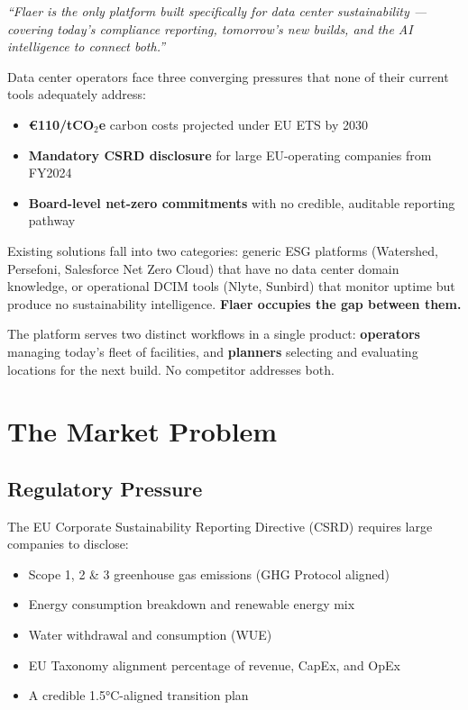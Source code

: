 \documentclass[11pt, a4paper]{article}
\begin{document}
\begin{tcolorbox}[flaerbox, title=One-line pitch]
\textit{``Flaer is the only platform built specifically for data center sustainability — covering today's compliance reporting, tomorrow's new builds, and the AI intelligence to connect both.''}
\end{tcolorbox}

\vspace{0.4cm}

Data center operators face three converging pressures that none of their current tools adequately address:

\begin{itemize}[leftmargin=1.4em]
  \item \textbf{€110/tCO$_2$e} carbon costs projected under EU ETS by 2030
  \item \textbf{Mandatory CSRD disclosure} for large EU-operating companies from FY2024
  \item \textbf{Board-level net-zero commitments} with no credible, auditable reporting pathway
\end{itemize}

Existing solutions fall into two categories: generic ESG platforms (Watershed, Persefoni, Salesforce Net Zero Cloud) that have no data center domain knowledge, or operational DCIM tools (Nlyte, Sunbird) that monitor uptime but produce no sustainability intelligence. \textbf{Flaer occupies the gap between them.}

The platform serves two distinct workflows in a single product: \textbf{operators} managing today's fleet of facilities, and \textbf{planners} selecting and evaluating locations for the next build. No competitor addresses both.

\section{The Market Problem}

\subsection{Regulatory Pressure}

The EU Corporate Sustainability Reporting Directive (CSRD) requires large companies to disclose:

\begin{itemize}[leftmargin=1.4em]
  \item Scope 1, 2 \& 3 greenhouse gas emissions (GHG Protocol aligned)
  \item Energy consumption breakdown and renewable energy mix
  \item Water withdrawal and consumption (WUE)
  \item EU Taxonomy alignment percentage of revenue, CapEx, and OpEx
  \item A credible 1.5°C-aligned transition plan
\end{itemize}
\end{document}
